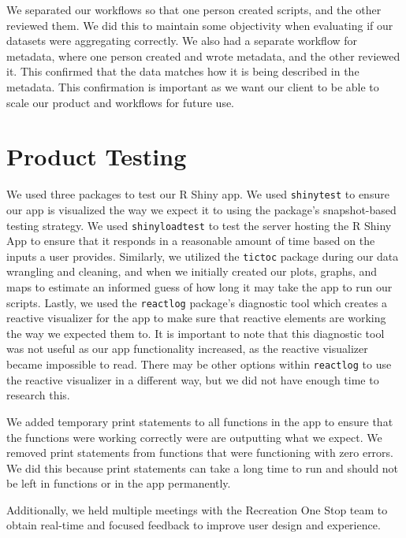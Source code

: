 \documentclass[
]{book}
\begin{document}
We separated our workflows so that one person created scripts, and the other reviewed them. We did this to maintain some objectivity when evaluating if our datasets were aggregating correctly. We also had a separate workflow for metadata, where one person created and wrote metadata, and the other reviewed it. This confirmed that the data matches how it is being described in the metadata. This confirmation is important as we want our client to be able to scale our product and workflows for future use.

\hypertarget{product-testing}{%
\section{Product Testing}\label{product-testing}}

We used three packages to test our R Shiny app. We used \texttt{shinytest} \citep{R-shinytest} to ensure our app is visualized the way we expect it to using the package's snapshot-based testing strategy. We used \texttt{shinyloadtest} \citep{R-shinyloadtest} to test the server hosting the R Shiny App to ensure that it responds in a reasonable amount of time based on the inputs a user provides. Similarly, we utilized the \texttt{tictoc} \citep{R-tictoc} package during our data wrangling and cleaning, and when we initially created our plots, graphs, and maps to estimate an informed guess of how long it may take the app to run our scripts. Lastly, we used the \texttt{reactlog} \citep{R-reactlog} package's diagnostic tool which creates a reactive visualizer for the app to make sure that reactive elements are working the way we expected them to. It is important to note that this diagnostic tool was not useful as our app functionality increased, as the reactive visualizer became impossible to read. There may be other options within \texttt{reactlog} to use the reactive visualizer in a different way, but we did not have enough time to research this.

We added temporary print statements to all functions in the app to ensure that the functions were working correctly were are outputting what we expect. We removed print statements from functions that were functioning with zero errors. We did this because print statements can take a long time to run and should not be left in functions or in the app permanently.

Additionally, we held multiple meetings with the Recreation One Stop team to obtain real-time and focused feedback to improve user design and experience.
\end{document}
